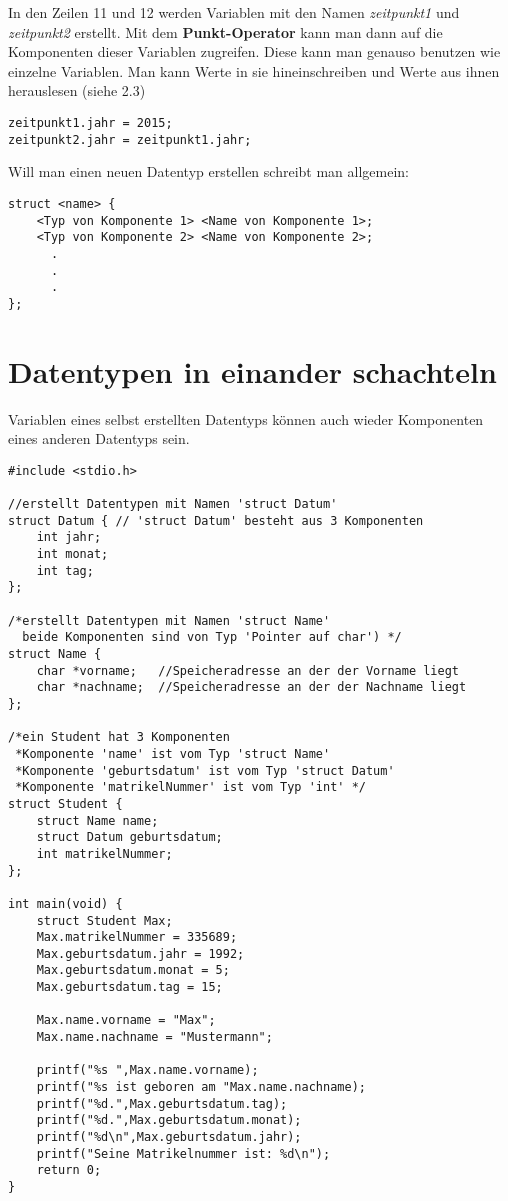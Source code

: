 \documentclass[c_worksheet.tex]{subfiles}
\begin{document}
In den Zeilen 11 und 12 werden Variablen mit den Namen \textit{zeitpunkt1} und \textit{zeitpunkt2} erstellt. Mit dem \textbf{Punkt-Operator} kann man dann auf die Komponenten dieser Variablen zugreifen. Diese kann man genauso benutzen wie einzelne Variablen. Man kann Werte in sie hineinschreiben und Werte aus ihnen herauslesen (siehe 2.3)

\begin{lstlisting}
zeitpunkt1.jahr = 2015;
zeitpunkt2.jahr = zeitpunkt1.jahr;
\end{lstlisting}

Will man einen neuen Datentyp erstellen schreibt man allgemein:
\begin{lstlisting}
struct <name> {
    <Typ von Komponente 1> <Name von Komponente 1>;
    <Typ von Komponente 2> <Name von Komponente 2>;
      .
      .
      .
};
\end{lstlisting}

\section{Datentypen in einander schachteln}

Variablen eines selbst erstellten Datentyps können auch wieder Komponenten eines anderen Datentyps sein.

\begin{lstlisting}
#include <stdio.h>

//erstellt Datentypen mit Namen 'struct Datum'
struct Datum { // 'struct Datum' besteht aus 3 Komponenten
    int jahr;
    int monat;
    int tag;
};

/*erstellt Datentypen mit Namen 'struct Name'
  beide Komponenten sind von Typ 'Pointer auf char') */
struct Name { 
    char *vorname;   //Speicheradresse an der der Vorname liegt
    char *nachname;  //Speicheradresse an der der Nachname liegt
};

/*ein Student hat 3 Komponenten
 *Komponente 'name' ist vom Typ 'struct Name'
 *Komponente 'geburtsdatum' ist vom Typ 'struct Datum'
 *Komponente 'matrikelNummer' ist vom Typ 'int' */
struct Student {
    struct Name name;
    struct Datum geburtsdatum; 
    int matrikelNummer; 
};

int main(void) {
    struct Student Max;
    Max.matrikelNummer = 335689;
    Max.geburtsdatum.jahr = 1992;
    Max.geburtsdatum.monat = 5;
    Max.geburtsdatum.tag = 15;

    Max.name.vorname = "Max";
    Max.name.nachname = "Mustermann";

    printf("%s ",Max.name.vorname);
    printf("%s ist geboren am "Max.name.nachname);
    printf("%d.",Max.geburtsdatum.tag);
    printf("%d.",Max.geburtsdatum.monat);
    printf("%d\n",Max.geburtsdatum.jahr);
    printf("Seine Matrikelnummer ist: %d\n");
    return 0;
}
\end{lstlisting}
\end{document}
